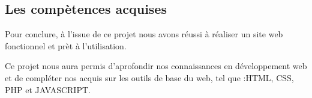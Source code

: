 \documentclass[oneside,11pt,a4paper]{article}
\begin{document}
\subsection{Les compètences acquises}

Pour conclure, à l’issue de ce projet nous avons réussi à réaliser un site web fonctionnel et prèt à l'utilisation. 

Ce projet nous aura permis d’aprofondir nos connaissances en développement web et de compléter nos acquis sur les outils de base du web, tel que :HTML, CSS, PHP et JAVASCRIPT.
\end{document}
